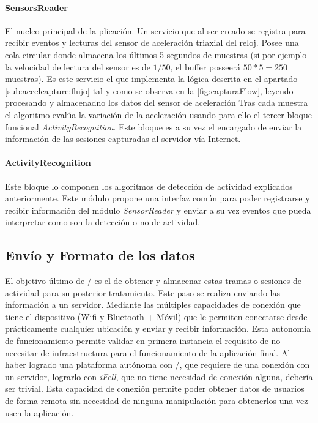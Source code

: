 \paragraph{SensorsReader}
El nucleo principal de la plicación. Un servicio que al ser creado se registra para recibir eventos y lecturas del sensor de aceleración triaxial del reloj. Posee una cola circular donde almacena los últimos 5 segundos de muestras (si por ejemplo la velocidad de lectura del sensor es de $1/50$, el buffer posseerá $50 * 5 = 250$ muestras).
Es este servicio el que implementa la lógica descrita en el apartado \ref{sub:accelcapture:flujo} tal y como se observa en la \autoref{fig:capturaFlow}, leyendo procesando y almacenadno los datos del sensor de aceleración  Tras cada muestra el algoritmo evalúa la variación de la aceleración usando para ello el tercer bloque funcional \textit{ActivityRecognition}. Este bloque es a su vez el encargado de enviar la información de las sesiones capturadas al servidor vía Internet.

\paragraph{ActivityRecognition}
Este bloque lo componen los algoritmos de detección de actividad explicados anteriormente. Este módulo propone una interfaz común para poder registrarse y recibir información del módulo \textit{SensorReader} y enviar a su vez eventos que pueda interpretar como son la detección o no de actividad.


\subsection{Envío y Formato de los datos}\label{sub:accelcapture:red}

El objetivo último de \accelcapture/ es el de obtener y almacenar estas tramas o sesiones de actividad para su posterior tratamiento. Este paso se realiza enviando las información a un servidor. Mediante las múltiples capacidades de conexión que tiene el dispositivo (Wifi y Bluetooth + Móvil) que le permiten conectarse desde prácticamente cualquier ubicación y enviar y recibir información. Esta autonomía de funcionamiento permite validar en primera instancia el requisito de no necesitar de infraestructura para el funcionamiento de la aplicación final. Al haber logrado una plataforma autónoma con \accelcapture/, que requiere de una conexión con un servidor, lograrlo con \textit{iFell}, que no tiene necesidad de conexión alguna, debería ser trivial. Esta capacidad de conexión permite poder obtener datos de usuarios de forma remota sin necesidad de ninguna manipulación para obtenerlos una vez usen la aplicación.

